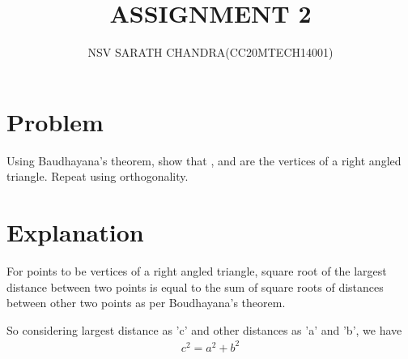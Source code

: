 \documentclass[journal,12pt,twocolumn]{IEEEtran}
\begin{document}
\title{ASSIGNMENT 2}
\author{NSV SARATH CHANDRA(CC20MTECH14001)}
\maketitle
\newpage
\bigskip
\renewcommand{\thefigure}{\theenumi}
\renewcommand{\thetable}{\theenumi}

    
\section{Problem}
Using Baudhayana's theorem, show that ,  and  are the vertices of a right angled triangle. Repeat using orthogonality.  


\section{Explanation}\label{Explanation}

For points to be vertices of a right angled triangle, square root of the largest distance between two points is equal to the sum of square roots of distances between other two points as per Boudhayana's theorem. 

So considering largest distance as 'c' and other distances as 'a' and 'b', we have 
\begin{align}
c^2 = a^2  + b^2
\end{align}
\end{document}
